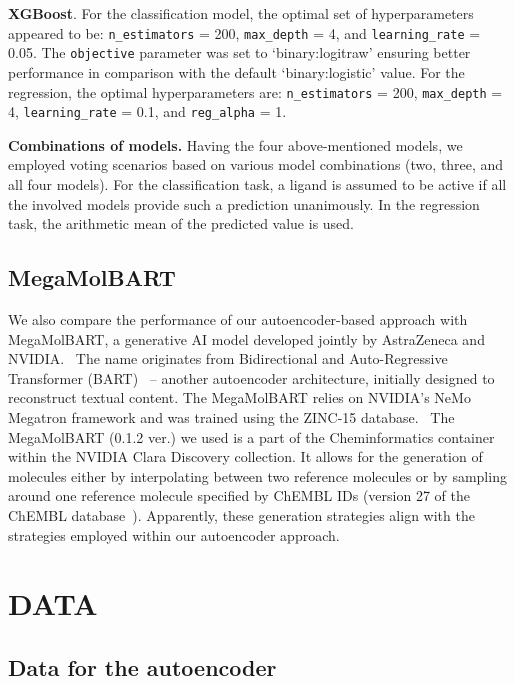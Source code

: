 \documentclass[12pt]{article}
\begin{document}
\textbf{XGBoost}.
For the classification model, the optimal set of hyperparameters appeared to be:
\texttt{n\_estimators} = 200,
\texttt{max\_depth} = 4,
and \texttt{learning\_rate} = 0.05.
The \texttt{objective} parameter was set to `binary:logitraw' ensuring better performance in comparison with the default `binary:logistic' value.
For the regression, the optimal hyperparameters are:
\texttt{n\_estimators} = 200,
\texttt{max\_depth} = 4,
\texttt{learning\_rate} = 0.1,
and \texttt{reg\_alpha} = 1.

\textbf{Combinations of models.} Having the four above-mentioned models, we employed voting scenarios based on various model combinations (two, three, and all four models).
For the classification task, a ligand is assumed to be active if all the involved models provide such a prediction unanimously. 
In the regression task, the arithmetic mean of the predicted value is used.


\subsection*{\sffamily \large MegaMolBART}

We also compare the performance of our autoencoder-based approach with  MegaMolBART, a generative AI model developed jointly by AstraZeneca and NVIDIA.~\cite{Philippidis2021} 
The name originates from Bidirectional and Auto-Regressive Transformer (BART)~\cite{Lewis2020} -- another autoencoder architecture, initially designed to reconstruct textual content.
The MegaMolBART relies on NVIDIA's NeMo Megatron framework and was trained using the ZINC-15 database.~\cite{Sterling2015}
The MegaMolBART (0.1.2 ver.) we used is a part of the Cheminformatics container~\cite{NVIDIA_Cheminformatics} within the NVIDIA Clara Discovery collection.
It allows for the generation of molecules either by interpolating between two reference molecules or by sampling around one reference molecule specified by ChEMBL IDs (version 27 of the ChEMBL database~\cite{Mendez2018,ChEMBL27}).
Apparently, these generation strategies align with the strategies employed within our autoencoder approach.


\section*{\sffamily \Large DATA}\label{sec:Data}

\subsection*{\sffamily \large Data for the autoencoder}
\end{document}
